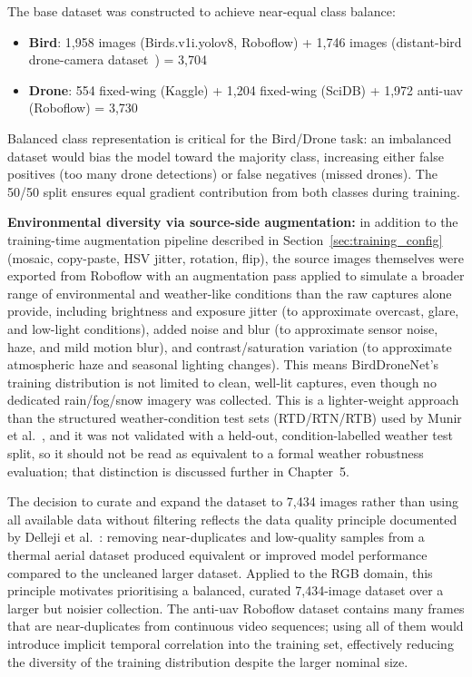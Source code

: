 \documentclass[12pt,a4paper]{report}
\begin{document}
The base dataset was constructed to achieve near-equal class balance:
\begin{itemize}
  \item \textbf{Bird}: 1,958 images (Birds.v1i.yolov8, Roboflow) + 1,746 images (distant-bird drone-camera dataset~\cite{fujii2021bird}) = 3,704
  \item \textbf{Drone}: 554 fixed-wing (Kaggle) + 1,204 fixed-wing (SciDB) + 1,972 anti-uav (Roboflow) = 3,730
\end{itemize}

Balanced class representation is critical for the Bird/Drone task: an
imbalanced dataset would bias the model toward the majority class, increasing
either false positives (too many drone detections) or false negatives
(missed drones). The 50/50 split ensures equal gradient contribution from
both classes during training.

\textbf{Environmental diversity via source-side augmentation:} in addition
to the training-time augmentation pipeline described in
Section~\ref{sec:training_config} (mosaic, copy-paste, HSV jitter, rotation,
flip), the source images themselves were exported from Roboflow with an
augmentation pass applied to simulate a broader range of environmental and
weather-like conditions than the raw captures alone provide, including
brightness and exposure jitter (to approximate overcast, glare, and low-light
conditions), added noise and blur (to approximate sensor noise, haze, and
mild motion blur), and contrast/saturation variation (to approximate
atmospheric haze and seasonal lighting changes). This means BirdDroneNet's
training distribution is not limited to clean, well-lit captures, even
though no dedicated rain/fog/snow imagery was collected. This is a lighter-weight
approach than the structured weather-condition test sets (RTD/RTN/RTB) used
by Munir et al.~\cite{munir2023kfupm}, and it was not validated with a
held-out, condition-labelled weather test split, so it should not be read as
equivalent to a formal weather robustness evaluation; that distinction is
discussed further in Chapter~5.

The decision to curate and expand the dataset to 7,434 images rather than
using all available data without filtering reflects the data quality principle documented
by Delleji et al.~\cite{delleji2025thermal}: removing near-duplicates
and low-quality samples from a thermal aerial dataset produced equivalent
or improved model performance compared to the uncleaned larger dataset.
Applied to the RGB domain, this principle motivates prioritising a
balanced, curated 7,434-image dataset over a larger but noisier
collection. The anti-uav Roboflow dataset contains many frames that are
near-duplicates from continuous video sequences; using
all of them would introduce implicit temporal correlation into the
training set, effectively reducing the diversity of the training
distribution despite the larger nominal size.
\end{document}

